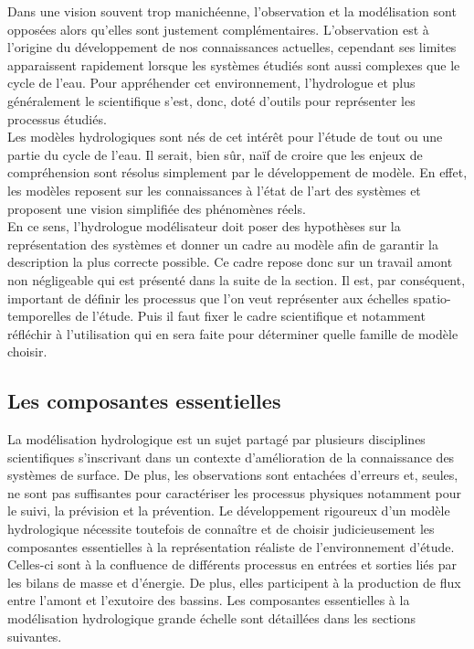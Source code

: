 \noindent Dans une vision souvent trop manichéenne, l'observation et la modélisation sont opposées alors qu'elles sont justement complémentaires. L'observation est à l'origine du développement de nos connaissances actuelles, cependant ses limites apparaissent rapidement lorsque les systèmes étudiés sont aussi complexes que le cycle de l'eau. Pour appréhender cet environnement, l'hydrologue et plus généralement le scientifique s'est, donc, doté d'outils pour représenter les processus étudiés. \\

\noindent Les modèles hydrologiques sont nés de cet intérêt pour l'étude de tout ou une partie du cycle de l'eau. Il serait, bien sûr, naïf de croire que les enjeux de compréhension sont résolus simplement par le développement de modèle. En effet, les modèles reposent sur les connaissances à l'état de l'art des systèmes et proposent une vision simplifiée des phénomènes réels.\\
En ce sens, l'hydrologue modélisateur doit poser des hypothèses sur la représentation des systèmes et donner un cadre au modèle afin de garantir la description la plus correcte possible. Ce cadre repose donc sur un travail amont non négligeable qui est présenté dans la suite de la section. Il est, par conséquent, important de définir les processus que l'on veut représenter aux échelles spatio-temporelles de l'étude. Puis il faut fixer le cadre scientifique et notamment réfléchir à l'utilisation qui en sera faite pour déterminer quelle famille de modèle choisir.
\subsection{{\selectfont Les composantes essentielles}}

La modélisation hydrologique est un sujet partagé par plusieurs disciplines scientifiques s'inscrivant dans un contexte d'amélioration de la connaissance des systèmes de surface. De plus, les observations sont entachées d'erreurs et, seules, ne sont pas suffisantes pour caractériser les processus physiques notamment pour le suivi, la prévision et la prévention. Le développement rigoureux d'un modèle hydrologique nécessite toutefois de connaître et de choisir judicieusement les composantes essentielles à la représentation réaliste de l'environnement d'étude. Celles-ci sont à la confluence de différents processus en entrées et sorties liés par les bilans de masse et d'énergie. De plus, elles participent à la production de flux entre l'amont et l'exutoire des bassins. Les composantes essentielles à la modélisation hydrologique grande échelle sont détaillées dans les sections suivantes.

